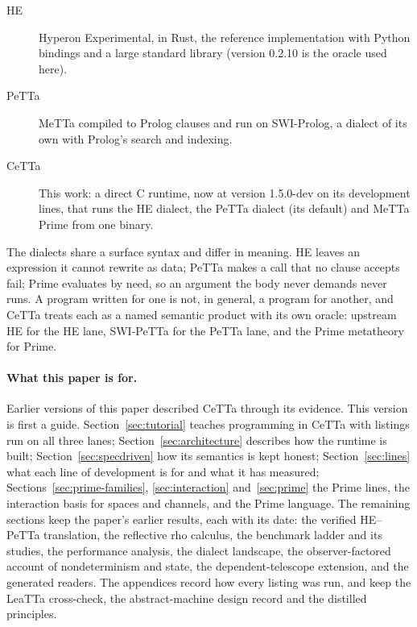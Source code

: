 \documentclass[11pt]{article}
\newcommand{\PeTTa}{\textup{PeTTa}}
\newcommand{\HE}{\textup{HE}}
\newcommand{\CeTTa}{\textup{CeTTa}}
\newcommand{\LeaTTa}{\textup{LeaTTa}}
\begin{document}
\begin{description}
\item[\HE{}] Hyperon Experimental, in Rust, the reference implementation with
  Python bindings and a large standard library (version 0.2.10 is the
  oracle used here).
\item[\PeTTa{}] MeTTa compiled to Prolog clauses and run on SWI-Prolog, a
  dialect of its own with Prolog's search and indexing.
\item[\CeTTa{}] This work: a direct C runtime, now at version 1.5.0-dev on its
  development lines, that runs the \HE{} dialect, the \PeTTa{} dialect (its
  default) and MeTTa Prime from one binary.
\end{description}

\noindent
The dialects share a surface syntax and differ in meaning.  \HE{} leaves an
expression it cannot rewrite as data; \PeTTa{} makes a call that no clause
accepts fail; Prime evaluates by need, so an argument the body never demands
never runs.  A program written for one is not, in general, a program for
another, and \CeTTa{} treats each as a named semantic product with its own
oracle: upstream \HE{} for the \HE{} lane, SWI-\PeTTa{} for the \PeTTa{} lane,
and the Prime metatheory for Prime.

\paragraph{What this paper is for.}  Earlier versions of this paper described
\CeTTa{} through its evidence.  This version is first a guide.
Section~\ref{sec:tutorial} teaches programming in \CeTTa{} with listings run
on all three lanes; Section~\ref{sec:architecture} describes how the runtime
is built; Section~\ref{sec:specdriven} how its semantics is kept honest;
Section~\ref{sec:lines} what each line of development is for and what it has
measured; Sections~\ref{sec:prime-families}, \ref{sec:interaction}
and~\ref{sec:prime} the Prime lines, the interaction basis for spaces and
channels, and the Prime language.  The remaining sections keep the paper's
earlier results, each with its date: the verified \HE{}--\PeTTa{} translation,
the reflective rho calculus, the benchmark ladder and its studies, the
performance analysis, the dialect landscape, the observer-factored account of
nondeterminism and state, the dependent-telescope extension, and the generated
readers.  The appendices record how every listing was run, and keep the
\LeaTTa{} cross-check, the abstract-machine design record and the distilled
principles.
\end{document}

